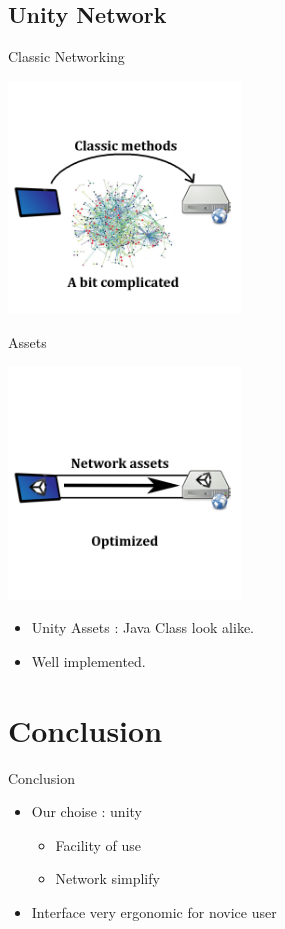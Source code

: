 \documentclass[a4paper,10pt]{beamer}
\begin{document}
		\subsection{Unity Network}
			
			\begin{frame}{Classic Networking}
					\centerline{\includegraphics[height=175pt]{images/network/classicnet.png}}
			\end{frame}
			
			\begin{frame}{Assets}
				\centerline{\includegraphics[height=175pt]{images/network/optimized.png}}
				
				\begin{itemize}
						\item Unity Assets : Java Class look alike.
						\item Well implemented.
				\end{itemize}	
			\end{frame}
			
		

	
	\section{Conclusion}
	
		\begin{frame}{Conclusion}
			\begin{itemize}
				\item Our choise : unity
					\begin{itemize}
						\item Facility of use
						\item Network simplify
					\end{itemize}
				\item Interface very ergonomic for novice user
			\end{itemize}
		\end{frame}
		
\end{document}

